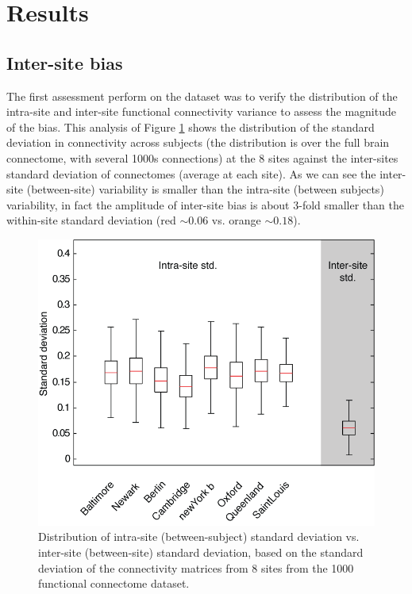 \documentclass[authoryear]{elsarticle}
\begin{document}
 
\section{Results}

\subsection{Inter-site bias}
The first assessment perform on the dataset was to verify the distribution of the intra-site and inter-site functional connectivity variance to assess the magnitude of the bias. This analysis of Figure \ref{fig_site_variability} shows the distribution of the standard deviation in connectivity across subjects (the distribution is over the full brain connectome, with several 1000s connections) at the 8 sites against the inter-sites standard deviation of connectomes (average at each site). As we can see the inter-site (between-site) variability is smaller than the intra-site (between subjects) variability, in fact the amplitude of inter-site bias is about 3-fold smaller than the within-site standard deviation (red $\sim 0.06$ vs. orange $\sim 0.18$).

\begin{figure}[tbp]
\begin{center}
\includegraphics[width=\linewidth]{../figures/inter_vs_intra_3tonly.png}
\end{center}
\caption[inter vs. intra site variability]{
  Distribution of intra-site (between-subject) standard deviation vs. inter-site (between-site) standard deviation, based on the standard deviation of the connectivity matrices from 8 sites from the 1000 functional connectome dataset.
}
\label{fig_site_variability}
\end{figure}
\end{document}
